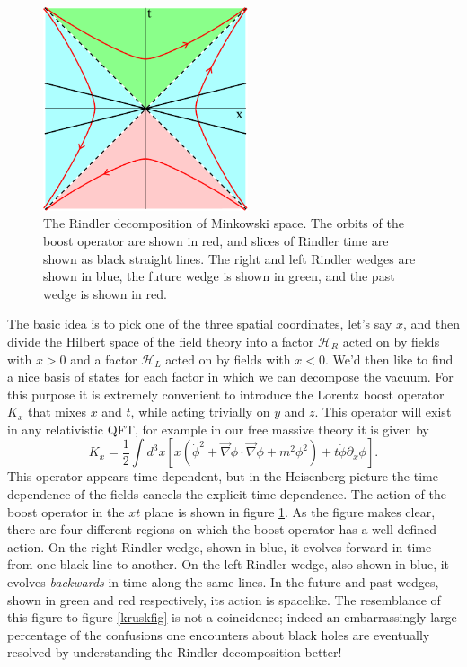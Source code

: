 \documentclass[12pt]{article}
\newcommand{\be}{\begin{equation}}
\newcommand{\ee}{\end{equation}}
\begin{document}
\begin{figure}
\begin{center}
\includegraphics[height=6cm]{boost.pdf}
\caption{The Rindler decomposition of Minkowski space.  The orbits of the boost operator are shown in red, and slices of Rindler time are shown as black straight lines.  The right and left Rindler wedges are shown in blue, the future wedge is shown in green, and the past wedge is shown in red.}\label{boost}
\end{center}
\end{figure}
The basic idea is to pick one of the three spatial coordinates, let's say $x$, and then divide the Hilbert space of the field theory into a factor $\mathcal{H}_R$ acted on by fields with $x>0$ and a factor $\mathcal{H}_L$ acted on by fields with $x<0$.  We'd then like to find a nice basis of states for each factor in which we can decompose the vacuum.  For this purpose it is extremely convenient to introduce the Lorentz boost operator $K_x$ that mixes $x$ and $t$, while acting trivially on $y$ and $z$.  This operator will exist in any relativistic QFT, for example in our free massive theory it is given by
\be\label{qftboost}
K_x=\frac{1}{2}\int d^3x \left[x (\dot{\phi}^2+\vec{\nabla}\phi \cdot \vec{\nabla}\phi+m^2\phi^2)+t\dot{\phi}\partial_x\phi\right].
\ee 
This operator appears time-dependent, but in the Heisenberg picture the time-dependence of the fields cancels the explicit time dependence.  The action of the boost operator in the $xt$ plane is shown in figure \ref{boost}.  As the figure makes clear, there are four different regions on which the boost operator has a well-defined action.  On the right Rindler wedge, shown in blue, it evolves forward in time from one black line to another.  On the left Rindler wedge, also shown in blue, it evolves \textit{backwards} in time along the same lines.  In the future and past wedges, shown in green and red respectively, its action is spacelike.  The resemblance of this figure to figure \ref{kruskfig} is not a coincidence; indeed an embarrassingly large percentage of the confusions one encounters about black holes are eventually resolved by understanding the Rindler decomposition better!
\end{document}
